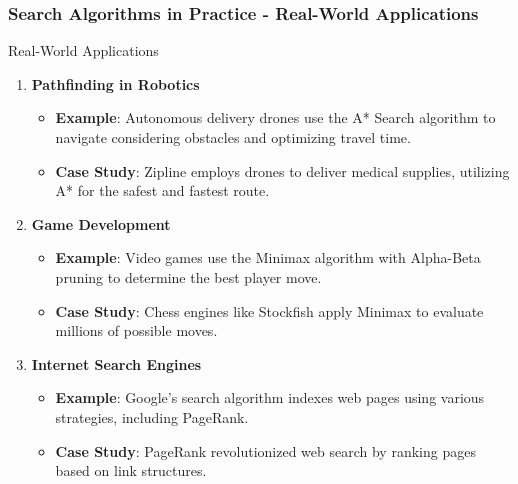 \documentclass[aspectratio=169]{beamer}
\begin{document}
\begin{frame}[fragile]
    \frametitle{Search Algorithms in Practice - Real-World Applications}
    \begin{block}{Real-World Applications}
        \begin{enumerate}
            \item \textbf{Pathfinding in Robotics}
                \begin{itemize}
                    \item \textbf{Example}: Autonomous delivery drones use the A* Search algorithm to navigate considering obstacles and optimizing travel time.
                    \item \textbf{Case Study}: Zipline employs drones to deliver medical supplies, utilizing A* for the safest and fastest route.
                \end{itemize}

            \item \textbf{Game Development}
                \begin{itemize}
                    \item \textbf{Example}: Video games use the Minimax algorithm with Alpha-Beta pruning to determine the best player move.
                    \item \textbf{Case Study}: Chess engines like Stockfish apply Minimax to evaluate millions of possible moves.
                \end{itemize}

            \item \textbf{Internet Search Engines}
                \begin{itemize}
                    \item \textbf{Example}: Google's search algorithm indexes web pages using various strategies, including PageRank.
                    \item \textbf{Case Study}: PageRank revolutionized web search by ranking pages based on link structures.
                \end{itemize}
        \end{enumerate}
    \end{block}
\end{frame}
\end{document}
